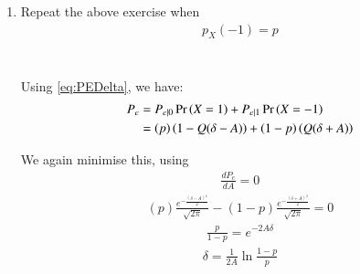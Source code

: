 \documentclass[journal,12pt,twocolumn]{IEEEtran}
\renewcommand\thesection{\arabic{section}}
\begin{document}
\begin{enumerate}[label=\thesection.\arabic*
,ref=\thesection.\theenumi]
	To minimise this, we will find the value at $A$ when
	\begin{align}
		\frac{dP_e}{dA} = 0 
	\end{align}
	\begin{align}
		\frac{1}{2} \frac{d}{dA}\left( 1 - Q(\delta - A) + Q(\delta + A) \right) = 0
	\end{align}
	\begin{align}
		\frac{e^{-\frac{\left( \delta - A\right)^2}{2}}}{\sqrt{2\pi}} - \frac{e^{-\frac{\left( \delta + A\right)^2}{2}}}{\sqrt{2\pi}} = 0
	\end{align}
	\begin{align}
		e^{-\frac{\left( \delta - A\right)^2}{2}} = e^{-\frac{\left( \delta + A\right)^2}{2}}
	\end{align}
	\begin{align}
		\frac{\left( \delta - A\right)^2}{2} = \frac{\left( \delta + A\right)^2}{2}
	\end{align}
	\begin{align}
		\left( \delta - A\right)^2 = \left( \delta + A\right)^2
	\end{align}
	\begin{align}
		\delta = 0
		\label{eq:AValue}
	\end{align}
	

\item Repeat the above exercise when 
	\begin{align}
		p_{X}(-1) = p
	\end{align}
	\\
	\solution
	\\
	Using \eqref{eq:PEDelta}, we have:
	\begin{align}
		P_e &= P_{e|0} \Pr\left(X = 1\right) + P_{e|1} \Pr\left(X = -1\right) \\
		&= \left(p\right) \left(1 - Q(\delta-A)\right) + \left(1-p\right) \left(Q(\delta+A)\right)
	\end{align}

	We again minimise this, using
	\begin{align}
		\frac{dP_e}{dA} = 0
	\end{align}
	\begin{align}
		\left(p\right) \frac{e^{-\frac{\left( \delta - A\right)^2}{2}}}{\sqrt{2\pi}} - \left(1-p\right) \frac{e^{-\frac{\left( \delta + A\right)^2}{2}}}{\sqrt{2\pi}} = 0
	\end{align}
	\begin{align}
		\frac{p}{1-p} = e^{-2A\delta}
	\end{align}
	\begin{align}
		\delta = \frac{1}{2A} \ln{\frac{1-p}{p}}
	\end{align}
	


\end{enumerate}
\end{document}
